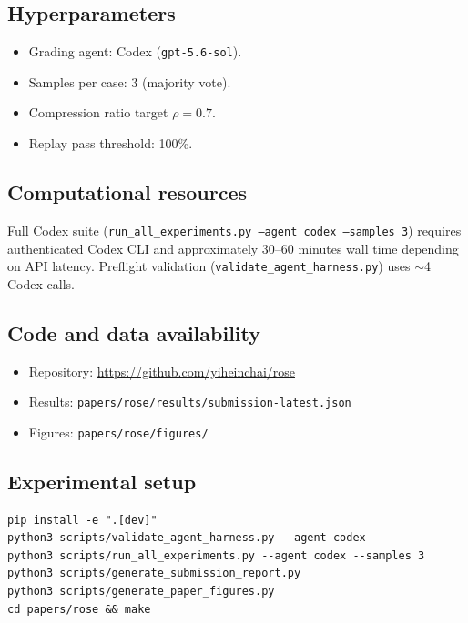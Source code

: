 \subsection{Hyperparameters}

\begin{itemize}
  \item Grading agent: Codex (\texttt{gpt-5.6-sol}).
  \item Samples per case: 3 (majority vote).
  \item Compression ratio target $\rho = 0.7$.
  \item Replay pass threshold: 100\%.
\end{itemize}

\subsection{Computational resources}

Full Codex suite (\texttt{run\_all\_experiments.py --agent codex --samples 3}) requires authenticated Codex CLI and approximately 30--60 minutes wall time depending on API latency.
Preflight validation (\texttt{validate\_agent\_harness.py}) uses $\sim$4 Codex calls.

\subsection{Code and data availability}

\begin{itemize}
  \item Repository: \url{https://github.com/yiheinchai/rose}
  \item Results: \texttt{papers/rose/results/submission-latest.json}
  \item Figures: \texttt{papers/rose/figures/}
\end{itemize}

\subsection{Experimental setup}

\begin{verbatim}
pip install -e ".[dev]"
python3 scripts/validate_agent_harness.py --agent codex
python3 scripts/run_all_experiments.py --agent codex --samples 3
python3 scripts/generate_submission_report.py
python3 scripts/generate_paper_figures.py
cd papers/rose && make
\end{verbatim}

